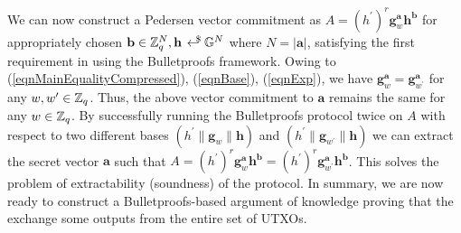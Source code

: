 
We can now construct a Pedersen vector commitment as $A = (h^{\prime})^{r}\textbf{g}_w^{\textbf{a}} \textbf{h}^{\textbf{b}}$ for appropriately chosen $\textbf{b} \in \Z_q^{N}, \textbf{h} \rgen \G^{N}$ where $N = |\textbf{a}|$,
satisfying the first requirement in using the Bulletproofs framework.
Owing to (\ref{eqnMainEqualityCompressed}), (\ref{eqnBase}), (\ref{eqnExp}), we have $\textbf{g}_w^{\textbf{a}} = \textbf{g}_{w^{\prime}}^{\textbf{a}}$ for any $w, w^{\prime} \in \mathbb{Z}_q$.
Thus, the above vector commitment to $\textbf{a}$ remains the same for any $w \in \mathbb{Z}_q$. By successfully running the Bulletproofs protocol twice on $A$ with respect to two different bases
$(h^{\prime} \| \textbf{g}_w \| \textbf{h})$ and $(h^{\prime} \| \textbf{g}_{w^{\prime}} \| \textbf{h})$ we can extract the secret vector $\textbf{a}$ such that $A = (h^{\prime})^{r}\textbf{g}_w^{\textbf{a}} \textbf{h}^{\textbf{b}} = (h^{\prime})^{r}\textbf{g}_{w^{\prime}}^{\textbf{a}} \textbf{h}^{\textbf{b}}$.
This solves the problem of extractability (soundness) of the protocol.
In summary, we are now ready to construct a Bulletproofs-based argument of knowledge proving that the exchange some outputs from the entire set of UTXOs.



